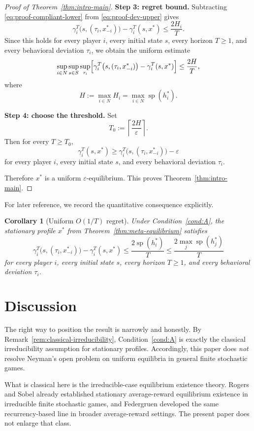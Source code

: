 \documentclass[11pt]{article}
\newtheorem{corollary}[theorem]{Corollary}
\theoremstyle{definition}
\newcommand{\1}{\mathbf{1}}
\DeclareMathOperator{\spn}{sp}
\begin{document}
\begin{proof}[Proof of Theorem~\ref{thm:intro-main}]
\smallskip
\noindent
\textbf{Step 3: regret bound.}
Subtracting \eqref{eq:proof-compliant-lower} from \eqref{eq:proof-dev-upper} gives
\[
\gamma_i^T\bigl(s,(\tau_i,x_{-i}^*)\bigr)-\gamma_i^T(s,x^*)\le \frac{2H_i}{T}.
\]
Since this holds for every player $i$, every initial state $s$, every horizon $T\ge1$, and every behavioral deviation $\tau_i$, we obtain the uniform estimate
\[
\sup_{i\in N}\sup_{s\in S}\sup_{\tau_i}\Bigl[\gamma_i^T\bigl(s,(\tau_i,x_{-i}^*)\bigr)-\gamma_i^T(s,x^*)\Bigr]
\le \frac{2H}{T},
\]
where
\[
H:=\max_{i\in N}H_i=\max_{i\in N}\spn(h_i^*).
\]

\smallskip
\noindent
\textbf{Step 4: choose the threshold.}
Set
\[
T_0:=\left\lceil \frac{2H}{\varepsilon}\right\rceil.
\]
Then for every $T\ge T_0$,
\[
\gamma_i^T(s,x^*)\ge \gamma_i^T\bigl(s,(\tau_i,x_{-i}^*)\bigr)-\varepsilon
\]
for every player $i$, every initial state $s$, and every behavioral deviation $\tau_i$.

Therefore $x^*$ is a uniform $\varepsilon$-equilibrium. This proves Theorem~\ref{thm:intro-main}.
\end{proof}

For later reference, we record the quantitative consequence explicitly.

\begin{corollary}[Uniform $O(1/T)$ regret]\label{cor:o1overT}
Under Condition~\ref{cond:A}, the stationary profile $x^*$ from Theorem~\ref{thm:meta-equilibrium} satisfies
\[
\gamma_i^T\bigl(s,(\tau_i,x_{-i}^*)\bigr)-\gamma_i^T(s,x^*)
\le \frac{2\spn(h_i^*)}{T}
\le \frac{2\max_j\spn(h_j^*)}{T}
\]
for every player $i$, every initial state $s$, every horizon $T\ge1$, and every behavioral deviation $\tau_i$.
\end{corollary}

\section{Discussion}\label{sec:discussion}

The right way to position the result is narrowly and honestly. By Remark~\ref{rem:classical-irreducibility}, Condition~\ref{cond:A} is exactly the classical irreducibility assumption for stationary profiles. Accordingly, this paper does \emph{not} resolve Neyman's open problem on uniform equilibria in general finite stochastic games.

What is classical here is the irreducible-case equilibrium existence theory. Rogers \cite{Rogers1969} and Sobel \cite{Sobel1971} already established stationary average-reward equilibrium existence in irreducible finite stochastic games, and Federgruen \cite{Federgruen1978} developed the same recurrency-based line in broader average-reward settings. The present paper does not enlarge that class.
\end{document}
